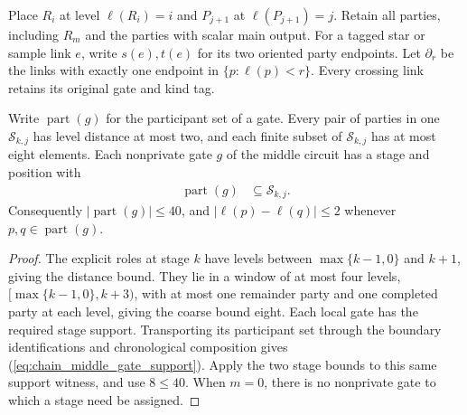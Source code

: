 \begin{definition}
    \label{def:chain_party_placement}
    \leanok
    Place $R_i$ at level $\ell(R_i)=i$ and $P_{j+1}$ at
    $\ell(P_{j+1})=j$.
    Retain all parties, including $R_m$ and the parties with scalar
    main output. For a tagged star or sample link $e$, write
    $s(e),t(e)$ for its two oriented party endpoints. Let $\partial_r$
    be the links with exactly one endpoint in $\{p:\ell(p)<r\}$.
    Every crossing link retains its original gate and kind tag.
\end{definition}

\begin{lemma}
    \label{thm:chain_middle_gate_support}
    \leanok
    Write $\operatorname{part}(g)$ for the participant set of a gate.
    Every pair of parties in one $\mathcal S_{k,j}$ has level distance
    at most two, and each finite subset of $\mathcal S_{k,j}$ has at
    most eight elements. Each nonprivate gate $g$ of the middle
    circuit has a stage and position with
    \begin{align}
        \operatorname{part}(g) & \subseteq\mathcal S_{k,j}.
        \label{eq:chain_middle_gate_support}
    \end{align}
    Consequently $|\operatorname{part}(g)|\le40$, and
    $|\ell(p)-\ell(q)|\le2$ whenever $p,q\in\operatorname{part}(g)$.
\end{lemma}
\begin{proof}\leanok
    The explicit roles at stage $k$ have levels between
    $\max\{k-1,0\}$ and $k+1$, giving the distance bound.
    They lie in a window of at most four levels,
    $[\max\{k-1,0\},k+3)$, with at most one remainder party and one
    completed party at each level, giving the coarse bound eight.
    Each local gate has the required stage support. Transporting its
    participant set through the boundary identifications and
    chronological composition gives (\ref{eq:chain_middle_gate_support}).
    Apply the two stage bounds to this same support witness, and use
    $8\le40$. When $m=0$, there is no nonprivate gate to which a stage
    need be assigned.
\end{proof}

